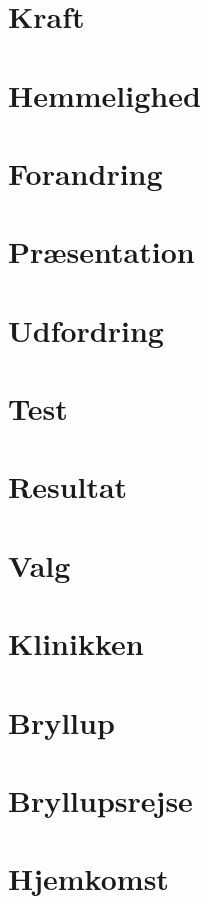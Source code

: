\documentclass[12pt]{book}
\begin{document}
\chapter{Kraft}  %

\chapter{Hemmelighed}  %

\chapter{Forandring}  %

\chapter{Præsentation}  %

\chapter{Udfordring}  %

\chapter{Test}  %

\chapter{Resultat}  %

\chapter{Valg}  %

\chapter{Klinikken}  %

\chapter{Bryllup}  %

\chapter{Bryllupsrejse}  %

\chapter{Hjemkomst}  %

\end{document}
